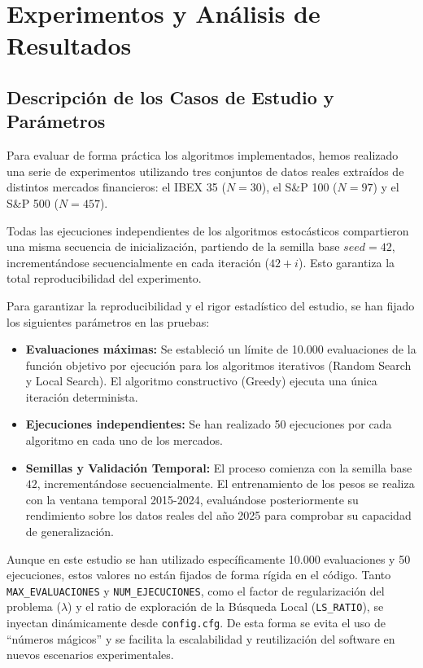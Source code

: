 \newpage
\section{Experimentos y Análisis de Resultados}
\label{sec:experimentos}

\subsection{Descripción de los Casos de Estudio y Parámetros}
Para evaluar de forma práctica los algoritmos implementados, hemos realizado una serie de experimentos utilizando tres conjuntos de datos reales extraídos de distintos mercados financieros: el IBEX 35 ($N=30$), el S\&P 100 ($N=97$) y el S\&P 500 ($N=457$). 

Todas las ejecuciones independientes de los algoritmos estocásticos compartieron una misma secuencia de inicialización, partiendo de la semilla base $seed = 42$, incrementándose secuencialmente en cada iteración ($42+i$). Esto garantiza la total reproducibilidad del experimento.

Para garantizar la reproducibilidad y el rigor estadístico del estudio, se han fijado los siguientes parámetros en las pruebas:
\begin{itemize}
    \item \textbf{Evaluaciones máximas:} Se estableció un límite de 10.000 evaluaciones de la función objetivo por ejecución para los algoritmos iterativos (Random Search y Local Search). El algoritmo constructivo (Greedy) ejecuta una única iteración determinista.
    \item \textbf{Ejecuciones independientes:} Se han realizado 50 ejecuciones por cada algoritmo en cada uno de los mercados.
    \item \textbf{Semillas y Validación Temporal:} El proceso comienza con la semilla base $42$, incrementándose secuencialmente. El entrenamiento de los pesos se realiza con la ventana temporal 2015-2024, evaluándose posteriormente su rendimiento sobre los datos reales del año 2025 para comprobar su capacidad de generalización.
\end{itemize}

Aunque en este estudio se han utilizado específicamente 10.000 evaluaciones y 50 ejecuciones, estos valores no están fijados de forma rígida en el código. Tanto \texttt{MAX\_EVALUACIONES} y \texttt{NUM\_EJECUCIONES}, como el factor de regularización del problema ($\lambda$) y el ratio de exploración de la Búsqueda Local (\texttt{LS\_RATIO}), se inyectan dinámicamente desde \texttt{config.cfg}. De esta forma se evita el uso de ``números mágicos'' y se facilita la escalabilidad y reutilización del software en nuevos escenarios experimentales.

